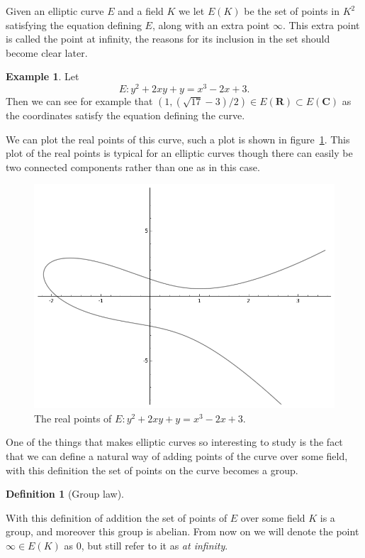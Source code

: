 \documentclass[a4paper,abstracton,bibtotoc]{scrreprt}
\theoremstyle{definition}
\newtheorem{defn}{Definition}
\newtheorem{ex}{Example}
\newcommand{\RR}{\mathbf{R}}
\newcommand{\CC}{\mathbf{C}}
\begin{document}
Given an elliptic curve $E$ and a field $K$ we let $E(K)$ be the set of points in $K^2$ satisfying the equation defining $E$, along with an extra point $\infty$.
This extra point is called the point at infinity, the reasons for its inclusion in the set should become clear later.

\begin{ex}
Let 
\[
E \colon y^2 + 2xy + y = x^3 - 2x + 3.
\]
Then we can see for example that $(1,(\sqrt{17}-3)/2)\in E(\RR) \subset E(\CC)$ as the coordinates satisfy the equation defining the curve.

We can plot the real points of this curve, such a plot is shown in figure~\ref{fig:ec}.
This plot of the real points is typical for an elliptic curves though there can easily be two connected components rather than one as in this case.
\begin{figure}
\centering
\includegraphics[scale=0.6]{sageec}
\caption{\label{fig:ec}The real points of $E \colon y^2 + 2xy + y = x^3 - 2x + 3$.}
\end{figure}
\end{ex}

One of the things that makes elliptic curves so interesting to study is the fact that we can define a natural way of adding points of the curve over some field, with this definition the set of points on the curve becomes a group.

\begin{defn}[Group law] %
\end{defn}

With this definition of addition the set of points of $E$ over some field $K$ is a group, and moreover this group is abelian.
From now on we will denote the point $\infty\in E(K)$ as $0$, but still refer to it as \emph{at infinity}.
\end{document}
